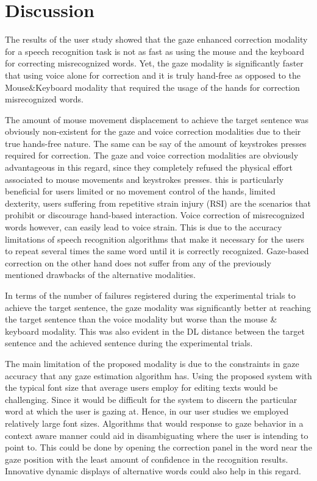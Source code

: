 \documentclass[]{article}
\begin{document}
 


\section{Discussion}
The results of the user study showed that the gaze enhanced correction modality for a speech recognition task is not
as fast as using the mouse and the keyboard for correcting misrecognized words. Yet, the gaze modality is
significantly faster that using voice alone for correction and it is truly hand-free as opposed to the Mouse\&Keyboard
modality that required the usage of the hands for correction misrecognized words.

The amount of mouse movement displacement to achieve the target sentence was obviously non-existent for the gaze and
voice correction modalities due to their true hands-free nature. The same can be say of the amount of keystrokes presses
required for correction. The gaze and voice correction modalities are obviously advantageous in this regard, since they
completely refused the physical effort associated to mouse movements and keystrokes presses. this is particularly
beneficial for users limited or no movement control of the hands, limited dexterity, users suffering from
repetitive strain injury (RSI) are the scenarios that prohibit or discourage hand-based interaction. Voice correction of
misrecognized words however, can easily lead to voice strain. This is due to the accuracy limitations of speech
recognition algorithms that make it necessary for the users to repeat several times the same word  until it is correctly
recognized. Gaze-based correction on the other hand does not suffer from any of the previously mentioned drawbacks of
the alternative modalities.

In terms of the number of failures registered during the experimental trials to achieve the target sentence, the gaze
modality was significantly better at reaching the target sentence than the voice modality but worse than the mouse \&
keyboard modality. This was also evident in the DL distance between the target sentence and the achieved sentence during
the experimental trials.


The main limitation of the proposed modality is due to the constraints in gaze accuracy that any gaze estimation
algorithm  has. Using the proposed system with the typical font size  that average users employ for editing texts  would
be challenging. Since it would be difficult for the system to discern the particular word at which the user is gazing
at. Hence, in our user studies we employed relatively large font sizes. Algorithms that would response to gaze behavior
in a context aware manner could aid in disambiguating where the user is intending to point to. This could be done by
opening the correction panel in the word near the gaze position with the least amount of confidence in the
recognition results. Innovative dynamic displays of alternative words could also help in this regard.
\end{document}
